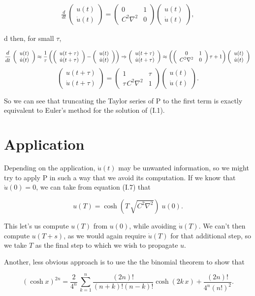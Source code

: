 \documentclass[amsmath,amssymb,floatfix]{revtex4}
\numberwithin{equation}{section}
\newcommand{\twomat}[4]{ \left( \begin{array}{cc} #1 & #2 \\ #3 & #4  \end{array} \right) }
\newcommand{\twovec}[2]{ \left( \begin{array}{c} #1  \\ #2   \end{array} \right) }
\begin{document}
\begin{eqnarray}
	 \frac{d}{d t} \, \twovec{u(t)}{\dot{u}(t)} =  \twomat{0}{1}{C^2\nabla^2}{0} \twovec{u(t)}{\dot{u}(t)}, 
\end{eqnarray}

\noindent d
then, for small $\tau$,


\begin{equation}
\frac{d}{d t} \, \twovec{u(t)}{\dot{u}(t)} \approx \frac{1}{\tau} \left( \twovec{u(t+\tau)}{\dot{u}(t+\tau)} - \twovec{u(t)}{\dot{u}(t)} \right) \Rightarrow \twovec{u(t+\tau)}{\dot{u}(t+\tau)} \approx \left( \twomat{0}{1}{C^2\nabla^2}{0}  \tau + 1  \right) \twovec{u(t)}{\dot{u}(t)} \nonumber \\
\end{equation}
\begin{equation} 
\twovec{u(t+\tau)}{\dot{u}(t+\tau)} = \twomat{1}{\tau}{\tau \, C^2\nabla^2}{1}  \twovec{u(t)}{\dot{u}(t)}.
\end{equation}

So we can see that truncating the Taylor series of $\textrm{P}$ to the first term is exactly equivalent to Euler's method for the solution of (I.1). 

\section{\label{sec:level3}Application\protect}

Depending on the application, $\dot{u}(t)$ may be unwanted information, so we might try to apply $\textrm{P}$ in such a way that we avoid its computation. If we know that $\dot{u}(0) = 0$, we can take from equation (I.7) that

\begin{equation}
	 u(T) = \cosh{( T \, \sqrt{C^2\nabla^2} )} \; u(0).
\end{equation}

This let's us compute $u(T)$ from $u(0)$, while avoiding $\dot{u}(T)$. We can't then compute $u(T+s)$, as we would again require $\dot{u}(T)$ for that additional step, so we take $T$ as the final step to which we wish to propagate $u$.

Another, less obvious approach is to use the the binomial theorem to show that

\begin{equation}
(\cosh{x})^{2n} =  \frac{2}{4^n} \, \sum _{k=1}^n  \frac{(2n)!}{(n+k)!(n-k)!} \cosh{(2k\,x)} + \frac{(2n)!}{4^n(n!)^2}.
\end{equation}
\end{document}
